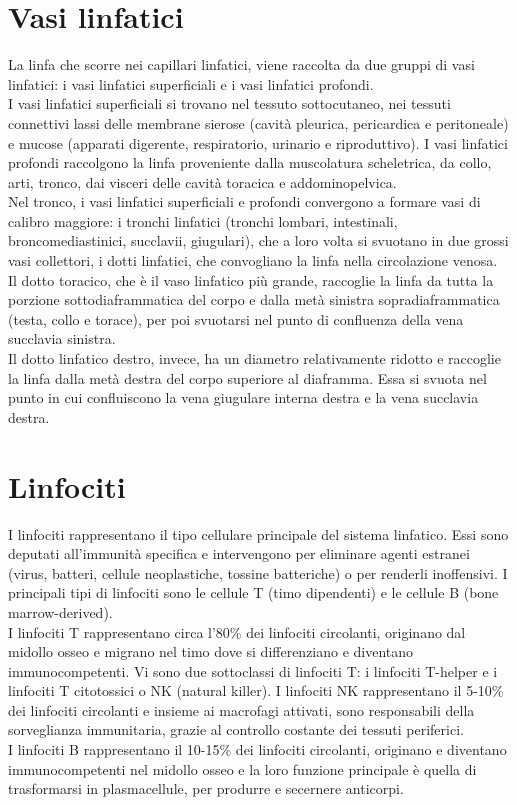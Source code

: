 \section{Vasi linfatici}
La linfa che scorre nei capillari linfatici, viene raccolta da due gruppi di vasi linfatici: i vasi linfatici 
superficiali e i vasi linfatici profondi.\\ 
I vasi linfatici superficiali si trovano nel tessuto sottocutaneo, nei tessuti connettivi lassi delle membrane sierose 
(cavità pleurica, pericardica e peritoneale) e mucose (apparati digerente, respiratorio, urinario e riproduttivo). 
I vasi linfatici profondi raccolgono la linfa proveniente dalla muscolatura scheletrica, da collo, arti, tronco, 
dai visceri delle cavità toracica e addominopelvica\cite{BOOK1}.\\
Nel tronco, i vasi linfatici superficiali e profondi convergono a formare vasi di calibro maggiore: 
i tronchi linfatici (tronchi lombari, intestinali, broncomediastinici, succlavii, giugulari), 
che a loro volta si svuotano in due grossi vasi collettori, i dotti linfatici, che convogliano la linfa 
nella circolazione venosa.\\  
Il dotto toracico, che è il vaso linfatico più grande, raccoglie la linfa da tutta la porzione sottodiaframmatica 
del corpo e dalla metà sinistra sopradiaframmatica (testa, collo e torace), per poi svuotarsi nel punto di confluenza della 
vena succlavia sinistra.\\ 
Il dotto linfatico destro, invece, ha un diametro relativamente ridotto e raccoglie la linfa dalla metà destra 
del corpo superiore al diaframma. Essa si svuota nel punto in cui confluiscono la vena giugulare interna destra e la 
vena succlavia destra\cite{BOOK1}.
 
\section{Linfociti}
I linfociti rappresentano il tipo cellulare principale del sistema linfatico. 
Essi sono deputati all'immunità specifica e intervengono per eliminare agenti estranei 
(virus, batteri, cellule neoplastiche, tossine batteriche) o per renderli inoffensivi. 
I principali tipi di linfociti sono le cellule T (timo dipendenti) e le cellule B (bone marrow-derived)\cite{BOOK2}.\\
I linfociti T rappresentano circa l’80\% dei linfociti circolanti, originano dal midollo osseo e migrano nel timo dove si 
differenziano e diventano immunocompetenti. 
Vi sono due sottoclassi di linfociti T: i linfociti T-helper e i linfociti T citotossici o NK (natural killer). 
I linfociti NK rappresentano il 5-10\% dei linfociti circolanti e insieme ai macrofagi attivati, 
sono responsabili della sorveglianza immunitaria, grazie al controllo costante dei tessuti periferici\cite{BOOK2}.\\
I linfociti B rappresentano il 10-15\% dei linfociti circolanti, originano e diventano immunocompetenti 
nel midollo osseo e la loro funzione principale è quella di trasformarsi in plasmacellule, 
per produrre e secernere anticorpi\cite{BOOK2}.


